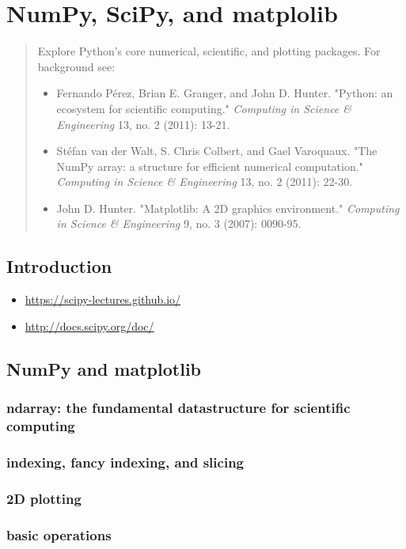 \chapter{NumPy, SciPy, and matplolib}

\begin{abstract}
Explore Python's core numerical, scientific, and plotting packages. For background
see:
\begin{itemize}
\item Fernando Pérez, Brian E. Granger, and John D. Hunter. "Python: an ecosystem for
scientific computing." \emph{Computing in Science \& Engineering} 13, no. 2 (2011):
13-21.
\item Stéfan van der Walt, S. Chris Colbert, and Gael Varoquaux. "The NumPy array: a
structure for efficient numerical computation." \emph{Computing in Science \&
Engineering} 13, no. 2 (2011): 22-30.
\item John D. Hunter. "Matplotlib: A 2D graphics environment." \emph{Computing
in Science \& Engineering} 9, no. 3 (2007): 0090-95.
\end{itemize}
\end{abstract}

\section{Introduction}
\begin{itemize}
\item \url{https://scipy-lectures.github.io/}
\item \url{http://docs.scipy.org/doc/}
\end{itemize}

\section{NumPy and matplotlib}

\subsection{ndarray: the fundamental datastructure for scientific computing}
\subsection{indexing, fancy indexing, and slicing}
\subsection{2D plotting}
\subsection{basic operations}


